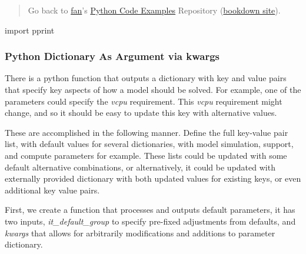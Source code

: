 \documentclass[
]{book}
\newenvironment{Shaded}{\begin{snugshade}}{\end{snugshade}}
\newcommand{\ImportTok}[1]{#1}
\newcommand{\NormalTok}[1]{#1}
\begin{document}
\begin{quote}
Go back to \href{http://fanwangecon.github.io/}{fan}'s \href{https://fanwangecon.github.io/pyfan/}{Python Code Examples} Repository (\href{https://fanwangecon.github.io/pyfan/bookdown}{bookdown site}).
\end{quote}

\begin{Shaded}
\begin{Highlighting}[]
\ImportTok{import}\NormalTok{ pprint}
\end{Highlighting}
\end{Shaded}

\hypertarget{python-dictionary-as-argument-via-kwargs}{%
\subsubsection{Python Dictionary As Argument via kwargs}\label{python-dictionary-as-argument-via-kwargs}}

There is a python function that outputs a dictionary with key and value pairs that specify key aspects of how a model should be solved. For example, one of the parameters could specify the \emph{vcpu} requirement. This \emph{vcpu} requirement might change, and so it should be easy to update this key with alternative values.

These are accomplished in the following manner. Define the full key-value pair list, with default values for several dictionaries, with model simulation, support, and compute parameters for example. These lists could be updated with some default alternative combinations, or alternatively, it could be updated with externally provided dictionary with both updated values for existing keys, or even additional key value pairs.

First, we create a function that processes and outputs default parameters, it has two inputs, \emph{it\_default\_group} to specify pre-fixed adjustments from defaults, and \emph{kwargs} that allows for arbitrarily modifications and additions to parameter dictionary.
\end{document}
